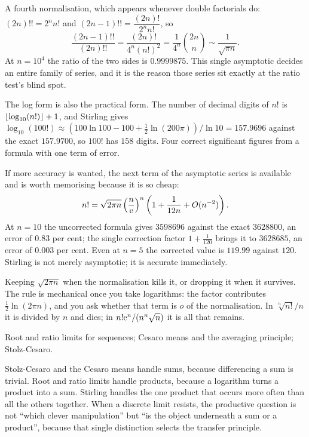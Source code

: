 A fourth normalisation, which appears whenever double factorials do: $(2n)!!=2^nn!$ and $(2n-1)!!=\dfrac{(2n)!}{2^nn!}$, so
\[\frac{(2n-1)!!}{(2n)!!}=\frac{(2n)!}{4^n(n!)^2}=\frac{1}{4^n}\binom{2n}{n}\sim\frac{1}{\sqrt{\pi n}}.\]
At $n=10^4$ the ratio of the two sides is $0.9999875$. This single asymptotic decides an entire family of series, and it is the reason those series sit exactly at the ratio test's blind spot.

The log form is also the practical form. The number of decimal digits of $n!$ is $\left\lfloor \log_{10}(n!)\right\rfloor+1$, and Stirling gives $\log_{10}(100!)\approx(100\ln100-100+\tfrac12\ln(200\pi))/\ln10=157.9696$ against the exact $157.9700$, so $100!$ has $158$ digits. Four correct significant figures from a formula with one term of error.

If more accuracy is wanted, the next term of the asymptotic series is available and is worth memorising because it is so cheap:
\[n!=\sqrt{2\pi n}\left(\frac{n}{\mathrm{e}}\right)^{n}\left(1+\frac{1}{12n}+O(n^{-2})\right).\]
At $n=10$ the uncorrected formula gives $3598696$ against the exact $3628800$, an error of $0.83$ per cent; the single correction factor $1+\tfrac{1}{120}$ brings it to $3628685$, an error of $0.003$ per cent. Even at $n=5$ the corrected value is $119.99$ against $120$. Stirling is not merely asymptotic; it is accurate immediately.

\begin{trap}
Keeping $\sqrt{2\pi n}$ when the normalisation kills it, or dropping it when it survives. The rule is mechanical once you take logarithms: the factor contributes $\tfrac12\ln(2\pi n)$, and you ask whether that term is $o$ of the normalisation. In $\sqrt[n]{n!}/n$ it is divided by $n$ and dies; in $n!\mathrm{e}^n/(n^n\sqrt n)$ it is all that remains.
\end{trap}

\begin{seealsob}Root and ratio limits for sequences; Cesaro means and the averaging principle; Stolz-Cesaro.\end{seealsob}

\begin{keynote}
Stolz-Cesaro and the Cesaro means handle sums, because differencing a sum is trivial. Root and ratio limits handle products, because a logarithm turns a product into a sum. Stirling handles the one product that occurs more often than all the others together. When a discrete limit resists, the productive question is not ``which clever manipulation'' but ``is the object underneath a sum or a product'', because that single distinction selects the transfer principle.
\end{keynote}


